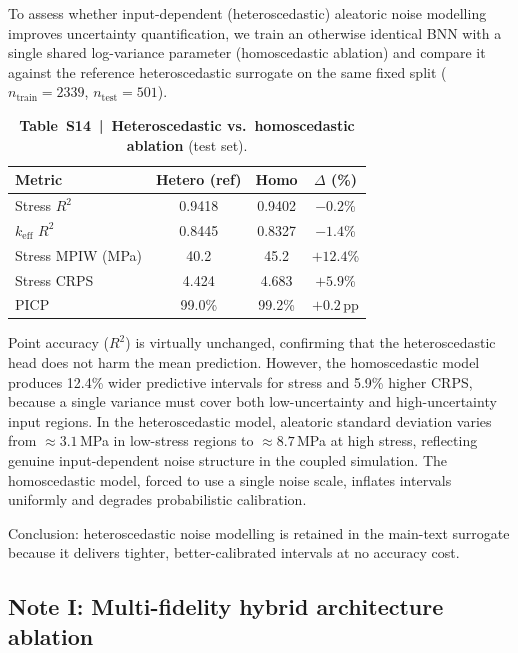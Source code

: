 \documentclass[11pt,a4paper]{article}
\newcommand{\keff}{\ensuremath{k_{\mathrm{eff}}}}
\begin{document}
To assess whether input-dependent (heteroscedastic) aleatoric noise
modelling improves uncertainty quantification, we train an otherwise
identical BNN with a single shared log-variance parameter
(homoscedastic ablation) and compare it against the reference
heteroscedastic surrogate on the same fixed split
($n_{\mathrm{train}} = 2339$, $n_{\mathrm{test}} = 501$).

\begin{table}[htbp]
\centering
\caption{\textbf{Table~S14~|~Heteroscedastic vs.\ homoscedastic ablation}
(test set).}
\label{tab:S14}
\smallskip
\small
\begin{tabular}{lccc}
\toprule
Metric & Hetero (ref) & Homo & $\Delta$ (\%) \\
\midrule
Stress $R^2$         & 0.9418 & 0.9402 & $-0.2$\%  \\
\keff{} $R^2$        & 0.8445 & 0.8327 & $-1.4$\%  \\
Stress MPIW (MPa)    & 40.2   & 45.2   & $+12.4$\% \\
Stress CRPS          & 4.424  & 4.683  & $+5.9$\%  \\
PICP                 & 99.0\% & 99.2\% & $+0.2$\,pp \\
\bottomrule
\end{tabular}
\end{table}

Point accuracy ($R^2$) is virtually unchanged, confirming that the
heteroscedastic head does not harm the mean prediction. However, the
homoscedastic model produces 12.4\% wider predictive intervals for
stress and 5.9\% higher CRPS, because a single variance must cover both
low-uncertainty and high-uncertainty input regions. In the
heteroscedastic model, aleatoric standard deviation varies from
${\approx}3.1$\,MPa in low-stress regions to ${\approx}8.7$\,MPa at
high stress, reflecting genuine input-dependent noise structure in the
coupled simulation. The homoscedastic model, forced to use a single
noise scale, inflates intervals uniformly and degrades probabilistic
calibration.

Conclusion: heteroscedastic noise modelling is retained in the main-text
surrogate because it delivers tighter, better-calibrated intervals at no
accuracy cost.


\subsection{Note I: Multi-fidelity hybrid architecture ablation}
\label{sec:noteI}
\end{document}
